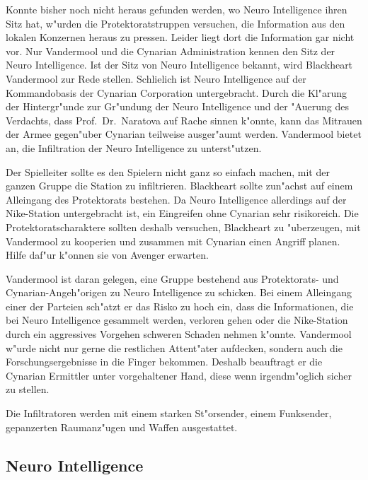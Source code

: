 Konnte bisher noch nicht heraus gefunden werden, wo Neuro Intelligence ihren Sitz hat, w"urden die Protektoratstruppen versuchen, die Information aus den lokalen Konzernen heraus zu pressen. Leider liegt dort die Information gar nicht vor. Nur Vandermool und die Cynarian Administration kennen den Sitz der Neuro Intelligence. Ist der Sitz von Neuro Intelligence bekannt, wird Blackheart Vandermool zur Rede stellen. Schlie\3lich ist Neuro Intelligence auf der Kommandobasis der Cynarian Corporation untergebracht. Durch die Kl"arung der Hintergr"unde zur Gr"undung der Neuro Intelligence und der "Au\3erung des Verdachts, dass Prof.~Dr.~Naratova auf Rache sinnen k"onnte, kann das Mi\3trauen der Armee gegen"uber Cynarian teilweise ausger"aumt werden. Vandermool bietet an, die Infiltration der Neuro Intelligence zu unterst"utzen.

\begin{remarks}
	Der Spielleiter sollte es den Spielern nicht ganz so einfach machen, mit der ganzen Gruppe die Station zu infiltrieren. Blackheart sollte zun"achst auf einem Alleingang des Protektorats bestehen. Da Neuro Intelligence allerdings auf der Nike-Station untergebracht ist, ein Eingreifen ohne Cynarian sehr risikoreich. Die Protektoratscharaktere sollten deshalb versuchen, Blackheart zu "uberzeugen, mit Vandermool zu kooperien und zusammen mit Cynarian einen Angriff planen. Hilfe daf"ur k"onnen sie von Avenger erwarten.
	
	Vandermool ist daran gelegen, eine Gruppe bestehend aus Protektorats- und Cynarian-Angeh"origen zu Neuro Intelligence zu schicken. Bei einem Alleingang einer der Parteien sch"atzt er das Risko zu hoch ein, dass die Informationen, die bei Neuro Intelligence gesammelt werden, verloren gehen oder die Nike-Station durch ein aggressives Vorgehen schweren Schaden nehmen k"onnte. Vandermool w"urde nicht nur gerne die restlichen Attent"ater aufdecken, sondern auch die Forschungsergebnisse in die Finger bekommen. Deshalb beauftragt er die Cynarian Ermittler unter vorgehaltener Hand, diese wenn irgendm"oglich sicher zu stellen.
	
	Die Infiltratoren werden mit einem starken St"orsender, einem Funksender, gepanzerten Raumanz"ugen und Waffen ausgestattet.
\end{remarks}

\subsection{Neuro Intelligence}

